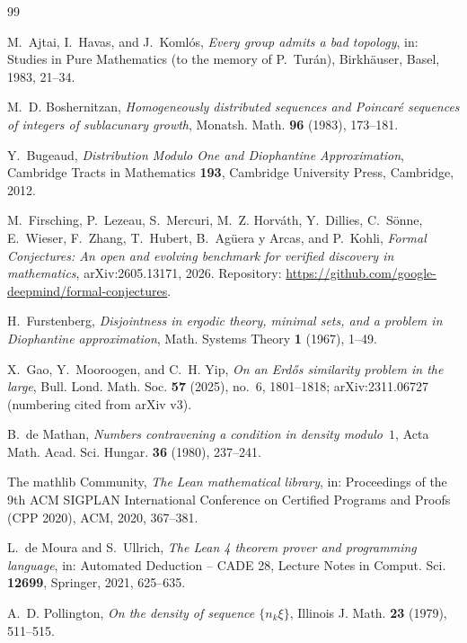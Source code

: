 \documentclass[11pt]{amsart}
\theoremstyle{plain}
\theoremstyle{definition}
\begin{document}
\begin{thebibliography}{99}
\raggedright

M.~Ajtai, I.~Havas, and J.~Koml\'os, \emph{Every group admits a bad topology}, in: Studies in Pure Mathematics (to the memory of P.~Tur\'an), Birkh\"auser, Basel, 1983, 21--34.

M.~D. Boshernitzan, \emph{Homogeneously distributed sequences and Poincar\'e sequences of integers of sublacunary growth}, Monatsh. Math. \textbf{96} (1983), 173--181.

Y.~Bugeaud, \emph{Distribution Modulo One and Diophantine Approximation}, Cambridge Tracts in Mathematics \textbf{193}, Cambridge University Press, Cambridge, 2012.

M.~Firsching, P.~Lezeau, S.~Mercuri, M.~Z. Horv\'ath, Y.~Dillies, C.~S\"onne, E.~Wieser, F.~Zhang, T.~Hubert, B.~Ag\"uera y Arcas, and P.~Kohli, \emph{Formal Conjectures: An open and evolving benchmark for verified discovery in mathematics}, arXiv:2605.13171, 2026. Repository: \url{https://github.com/google-deepmind/formal-conjectures}.

H.~Furstenberg, \emph{Disjointness in ergodic theory, minimal sets, and a problem in Diophantine approximation}, Math. Systems Theory \textbf{1} (1967), 1--49.

X.~Gao, Y.~Mooroogen, and C.~H. Yip, \emph{On an Erd\H{o}s similarity problem in the large}, Bull. Lond. Math. Soc. \textbf{57} (2025), no.~6, 1801--1818; arXiv:2311.06727 (numbering cited from arXiv v3).

B.~de Mathan, \emph{Numbers contravening a condition in density modulo~$1$}, Acta Math. Acad. Sci. Hungar. \textbf{36} (1980), 237--241.

The mathlib Community, \emph{The Lean mathematical library}, in: Proceedings of the 9th ACM SIGPLAN International Conference on Certified Programs and Proofs (CPP 2020), ACM, 2020, 367--381.

L.~de Moura and S.~Ullrich, \emph{The Lean 4 theorem prover and programming language}, in: Automated Deduction -- CADE 28, Lecture Notes in Comput. Sci. \textbf{12699}, Springer, 2021, 625--635.

A.~D. Pollington, \emph{On the density of sequence $\{n_k\xi\}$}, Illinois J. Math. \textbf{23} (1979), 511--515.

\end{thebibliography}
\end{document}
